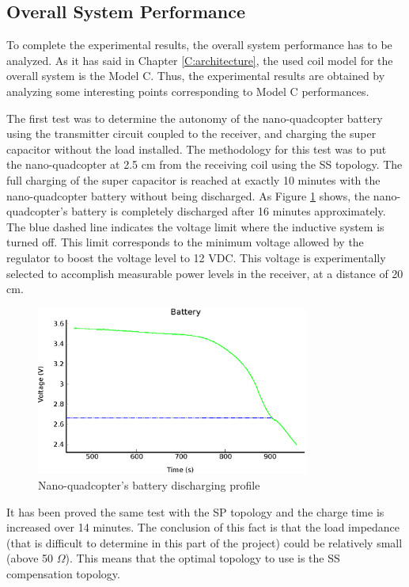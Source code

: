 	\subsection{Overall System Performance}

To complete the experimental results, the overall system performance has to be analyzed. As it has said in Chapter \ref{C:architecture}, the used coil model for the overall system is the Model C. Thus, the experimental results are obtained by analyzing some interesting points corresponding to Model C performances.

The first test was to determine the autonomy of the nano-quadcopter battery using the transmitter circuit coupled to the receiver, and charging the super capacitor without the load installed. The methodology for this test was to put the nano-quadcopter at 2.5 cm from the receiving coil using the SS topology. The full charging of the super capacitor is reached at exactly 10 minutes with the nano-quadcopter battery without being discharged. As Figure \ref{F:battery2} shows, the nano-quadcopter's  battery is completely discharged after 16 minutes approximately. The blue dashed line indicates the voltage limit where the inductive system is turned off. This limit corresponds to the minimum voltage allowed by the regulator to boost the voltage level to 12 VDC. This voltage is experimentally selected to accomplish measurable power levels in the receiver, at a distance of 20 cm.

\begin{figure}[htb]
\begin{center}
\includegraphics[width=0.8\textwidth]{./images/battery2}
\caption{Nano-quadcopter's battery discharging profile}
\label{F:battery2}
\end{center}
\end{figure}

It has been proved the same test with the SP topology and the charge time is increased over 14 minutes. The conclusion of this fact is that the load impedance (that is difficult to determine in this part of the project) could be relatively small (above 50 $\Omega$). This means that the optimal topology to use is the SS compensation topology.

